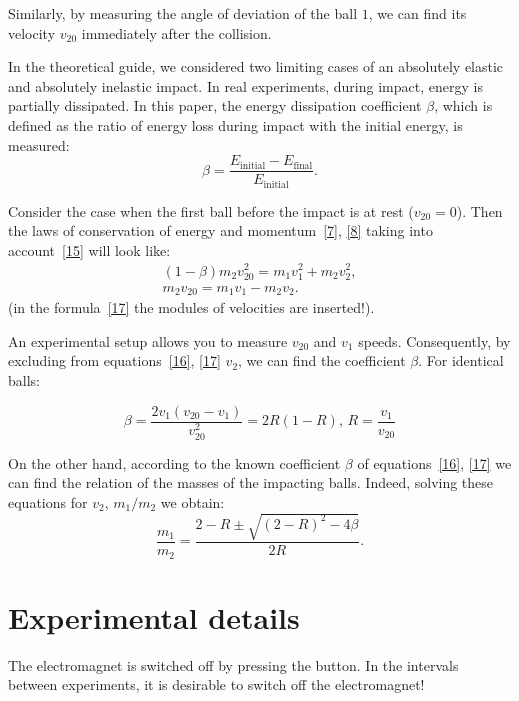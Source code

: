 \documentclass{LabWorkEng}
\begin{document}
Similarly, by measuring the angle of deviation of the ball $1$, we can find its velocity $v_{20}$ immediately after the collision.

In the theoretical guide, we considered two limiting cases of an absolutely elastic and absolutely inelastic impact. In real experiments, during impact, energy is partially dissipated. In this paper, the energy dissipation coefficient $\beta$, which is defined as the ratio of energy loss during impact with the initial energy, is measured:
\begin{equation}\label{15}
	\beta  = \frac{E_\mathrm{initial} - E_\mathrm{final}}{E_\mathrm{initial}}.
\end{equation}

Consider the case when the first ball before the impact is at rest ($v_{20} = 0$). Then the laws of conservation of energy and momentum~\eqref{7}, \eqref{8} taking into account~\eqref{15} will look like:
\begin{align}
	( 1 - \beta )m_2v_{20}^2 = m_1v_1^2 + m_2v_2^2, \label{16}\\
	m_2v_{20} = m_1v_1 - m_2v_2. \label{17}
\end{align}
(in the formula~\eqref{17} the modules of velocities are inserted!).

An experimental setup allows you to measure $v_{20}$ and $v_1$ speeds. Consequently, by excluding from equations~\eqref{16}, \eqref{17} $v_2$, we can find the coefficient $\beta$. For identical balls:

\begin{equation}\label{18}
	\beta  = \frac{{2{v_1}\left( {v_{20} - v_1} \right)}}{{v_{20}^2}} = 2R\left( {1 - R} \right), \, R = \frac{v_1}{v_{20}}
\end{equation}


On the other hand, according to the known coefficient $\beta$ of equations~\eqref{16}, \eqref{17} we can find the relation of the masses of the impacting balls. Indeed, solving these equations for $v_2$, $m_1/m_2$ we obtain:
\begin{equation}\label{19}
	\frac{{{m_1}}}{{{m_2}}} = \frac{{2 - R \pm \sqrt {{{\left( {2 - R} \right)}^2} - 4\beta } }}{{2R}}.
\end{equation}

\section{Experimental details}

The electromagnet is switched off by pressing the  button. In the intervals between experiments, it is desirable to switch off the electromagnet!
\end{document}
